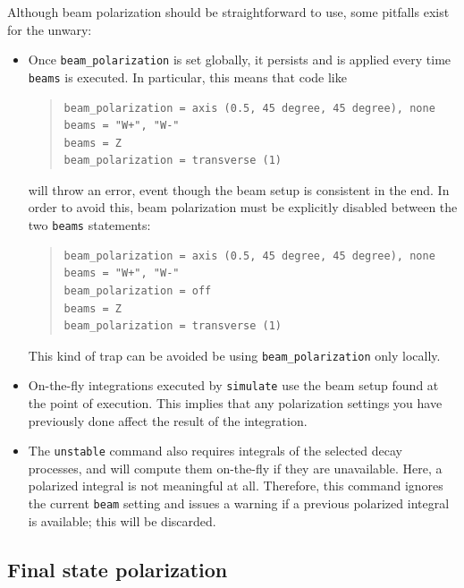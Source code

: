 \documentclass[12pt]{book}
\newcommand{\ttt}[1]{\texttt{#1}}
\begin{document}
Although beam polarization should be straightforward to use, some pitfalls exist
for the unwary:
\begin{itemize}
\item Once \ttt{beam\_polarization} is set globally, it persists and is applied
every time \ttt{beams} is executed. In particular, this means that code like
\begin{quote}
\begin{footnotesize}
\begin{verbatim}
beam_polarization = axis (0.5, 45 degree, 45 degree), none
beams = "W+", "W-"
beams = Z
beam_polarization = transverse (1)
\end{verbatim}
\end{footnotesize}
\end{quote}
will throw an error, event though the beam setup is consistent in the end.
In order to avoid this, beam polarization must be explicitly disabled between
the two \ttt{beams} statements:
\begin{quote}
\begin{footnotesize}
\begin{verbatim}
beam_polarization = axis (0.5, 45 degree, 45 degree), none
beams = "W+", "W-"
beam_polarization = off
beams = Z
beam_polarization = transverse (1)
\end{verbatim}
\end{footnotesize}
\end{quote}
This kind of trap can be avoided be using \ttt{beam\_polarization} only
locally.
%
\item On-the-fly integrations executed by \ttt{simulate}
use the beam
setup found at the point of execution. This implies that any polarization
settings you have previously done affect the result of the integration.
%
\item The \ttt{unstable} command also requires integrals of the selected decay
  processes, and will compute them on-the-fly if they are unavailable.  Here,
  a polarized integral is not meaningful at all.  Therefore, this command
  ignores the current \ttt{beam} setting and issues a warning if a previous
  polarized integral is available; this will be discarded.
\end{itemize}

\subsection{Final state polarization}
\end{document}
